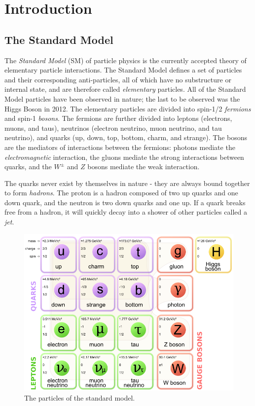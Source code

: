 \documentclass[10pt]{ucscthesisbs}
\begin{document}

\chapter{Introduction}
\section{The Standard Model}
The \textit{Standard Model} (SM) of particle physics is the currently accepted theory of elementary particle interactions. \cite{smoverview} The Standard Model defines a set of particles and their corresponding anti-particles, all of which have no substructure or internal state, and are therefore called \textit{elementary} particles. All of the Standard Model particles have been observed in nature; the last to be observed was the Higgs Boson in 2012. \cite{higgsdiscovery} The elementary particles are divided into spin-1/2 \textit{fermions} and spin-1 \textit{bosons}. The fermions are further divided into leptons (electrons, muons, and taus), neutrinos (electron neutrino, muon neutrino, and tau neutrino), and quarks (up, down, top, bottom, charm, and strange). The bosons are the mediators of interactions between the fermions: photons mediate the \textit{electromagnetic} interaction, the gluons mediate the strong interactions between quarks, and the $W^\pm$ and $Z$ bosons mediate the weak interaction. \par
The quarks never exist by themselves in nature - they are always bound together to form \textit{hadrons}. The proton is a hadron composed of two up quarks and one down quark, and the neutron is two down quarks and one up. If a quark breaks free from a hadron, it will quickly decay into a shower of other particles called a \textit{jet}. 
\begin{figure}
\includegraphics[width=\textwidth]{images/StandardModel}
\caption{The particles of the standard model.}
\end{figure}
\end{document}
